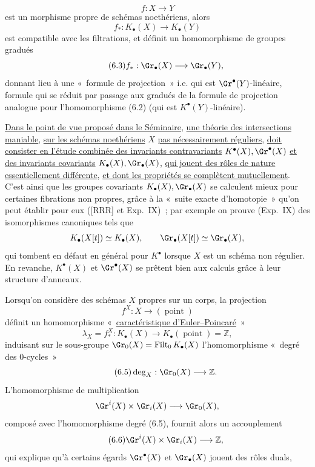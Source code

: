 \[
f:X\longrightarrow Y
\]
est un
morphisme propre de sch\'emas noeth\'eriens, alors
\begin{equation}\tag{6.2}
f_*:K_\bullet(X)\longrightarrow K_\bullet(Y)
\end{equation}
est compatible avec les filtrations, et d\'efinit un homomorphisme de groupes gradu\'es
\begin{equation}\tag{6.3}
f_*:\Gr_\bullet(X)\longrightarrow \Gr_\bullet(Y),
\end{equation}
donnant lieu \`a une «~formule de projection~» i.e. qui est $\Gr^\bullet(Y)$-lin\'eaire, formule qui se r\'eduit par passage aux gradu\'es de la formule de projection analogue pour l'homomorphisme (6.2) (qui est $K^\bullet(Y)$-lin\'eaire).

\uline{Dans le point de vue propos\'e dans le S\'eminaire}, \uline{une th\'eorie des intersections maniable}, \uline{sur les sch\'emas noeth\'eriens} $X$ \uline{pas n\'ecessairement r\'eguliers}, \uline{doit consister en l'\'etude combin\'ee des invariants contravariants} $K^\bullet(X),\Gr^\bullet(X)$ \uline{et des invariants covariants} $K_\bullet(X),\Gr_\bullet(X)$, \uline{qui jouent des r\^oles de nature essentiellement diff\'erente}, \uline{et dont les propri\'et\'es se compl\`etent mutuellement}. C'est ainsi que les groupes covariants $K_\bullet(X),\Gr_\bullet(X)$ se calculent mieux pour certaines fibrations non propres, gr\^ace \`a la «~suite exacte d'homotopie~» qu'on peut \'etablir pour eux ([RRR] et Exp.\ IX)~; par exemple on prouve (Exp.\ IX) des isomorphismes canoniques tels que
\[
K_\bullet(X[t])\simeq K_\bullet(X),\qquad \Gr_\bullet(X[t])\simeq \Gr_\bullet(X),
\]
qui tombent en d\'efaut en g\'en\'eral pour $K^\bullet$ lorsque $X$ est un sch\'ema non r\'egulier. En revanche, $K^\bullet(X)$ et $\Gr^\bullet(X)$ se pr\^etent bien aux calculs gr\^ace \`a leur structure d'anneaux.

Lorsqu'on consid\`ere des sch\'emas $X$ propres sur un corps, la projection
\[
f^X:X\longrightarrow(\operatorname{point})
\]
d\'efinit un homomorphisme «~\uline{caract\'eristique d'Euler--Poincar\'e}~»
\begin{equation}\tag{6.4}
\lambda_X=f^X_*:K_\bullet(X)\longrightarrow K_\bullet(\operatorname{point})=\mathbb Z,
\end{equation}
induisant sur le sous-groupe $\Gr_0(X)=\operatorname{Filt}_0K_\bullet(X)$ l'homomorphisme «~degr\'e des $0$-cycles~»
\begin{equation}\tag{6.5}
\deg_X:\Gr_0(X)\longrightarrow \mathbb Z.
\end{equation}
L'homomorphisme de multiplication
\[
\Gr^i(X)\times\Gr_i(X)\longrightarrow \Gr_0(X),
\]
compos\'e avec l'homomorphisme degr\'e (6.5), fournit alors un accouplement
\begin{equation}\tag{6.6}
\Gr^i(X)\times \Gr_i(X)\longrightarrow \mathbb Z,
\end{equation}
qui explique qu'\`a certains \'egards $\Gr^\bullet(X)$ et $\Gr_\bullet(X)$ jouent des r\^oles duals,
